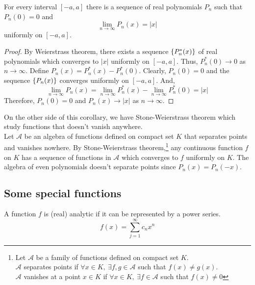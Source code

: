 \begin{corollary}
	For every interval $[-a,a]$ there is a sequence of real polynomials $P_n$ such that $P_n(0) = 0$ and
	\[ \lim_{n \to \infty} P_n(x) = |x| \]
	uniformly on $[-a,a]$.
\end{corollary}
\begin{proof}
	By Weierstrass theorem, there exists a sequence $\left\{P_n^\ast(x)\right\}$ of real polynomials which converges to $|x|$ uniformly on $[-a,a]$.
	Thus, $P_n^\ast(0) \to 0$ as $n \to \infty$.
	Define $P_n(x) = P_n^\ast(x) - P_n^\ast(0)$.
	Clearly, $P_n(0) = 0$ and the sequence $\left\{P_n(x)\right\}$ converges uniformly on $[-a,a]$.
	And,
	\[ \lim_{n \to \infty} P_n(x) = \lim_{n \to \infty} P_n^\ast(x) - \lim_{n \to \infty}P_n^\ast(0) = |x| \]	
	Therefore, $P_n(0) = 0$ and $P_n(x) \to |x|$ as $n \to \infty$.
\end{proof}

\begin{remark}
	On the other side of this corollary, we have Stone-Weierstrass theorem which study functions that doesn't vanish anywhere.\\

	Let $\mathscr{A}$ be an algebra of functions defined on compact set $K$ that separates points and vanishes nowhere.
	By Stone-Weierstrass theorem,\dag\footnote{
		\cite[\S7.32]{rudin} Let $\mathscr{A}$ be a family of functions defined on compact set $K$.\\
		$\mathscr{A}$ separates points if $\forall x \in K,\ \exists f,g \in \mathscr{A}$ such that $f(x) \ne g(x)$.\\
		$\mathscr{A}$ vanishes at a point $x \in K$ if $\forall x \in K,\ \exists f \in \mathscr{A}$ such that $f(x) \ne 0$ }
	any continuous function $f$ on $K$  has a sequence of functions in $\mathscr{A}$ which converges to $f$ uniformly on $K$.
	The algebra of even polynomials doesn't separate points since $P_n(x) = P_n(-x)$.
\end{remark}

\subsection{Some special functions}
\begin{definition}
	A function $f$ is (real) analytic if it can be represented by a power series.
	\[ f(x) = \sum_{j=1}^\infty c_n x^n \]
\end{definition}

